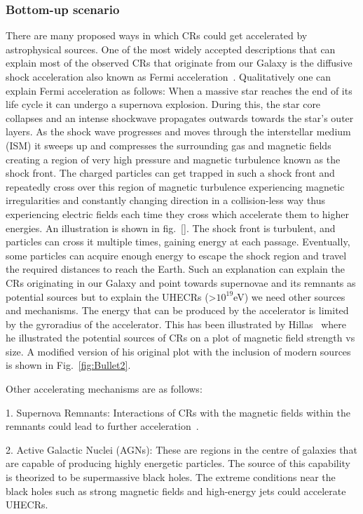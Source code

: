 \subsubsection{Bottom-up scenario}
\label{subsec:Bupsce}
There are many proposed ways in which CRs could get accelerated by astrophysical sources. One of the most widely accepted descriptions that can explain most of the observed CRs that originate from our Galaxy is the diffusive shock acceleration also known as Fermi acceleration~\cite{PhysRev.75.1169}. Qualitatively one can explain Fermi acceleration as follows: When a massive star reaches the end of its life cycle it can undergo a supernova explosion. During this, the star core collapses and an intense shockwave propagates outwards towards the star's outer layers. As the shock wave progresses and moves through the interstellar medium (ISM) it sweeps up and compresses the surrounding gas and magnetic fields creating a region of very high pressure and magnetic turbulence known as the shock front. The charged particles can get trapped in such a shock front and repeatedly cross over this region of magnetic turbulence experiencing magnetic irregularities and constantly changing direction in a collision-less way thus experiencing electric fields each time they cross which accelerate them to higher energies. An illustration is shown in fig.~\ref{}. The shock front is turbulent, and particles can cross it multiple times, gaining energy at each passage. Eventually, some particles can acquire enough energy to escape the shock region and travel the required distances to reach the Earth. Such an explanation can explain the CRs originating in our Galaxy and point towards supernovae and its remnants as potential sources but to explain the UHECRs (>$10^{19}$eV) we need other sources and mechanisms. The energy that can be produced by the accelerator is limited by the gyroradius of the accelerator. This has been illustrated by Hillas~\cite{1984ARA&A..22..425H} where he illustrated the potential sources of CRs on a plot of magnetic field strength vs size. A modified version of his original plot with the inclusion of modern sources is shown in Fig.~\ref{fig:Bullet2}.   

Other accelerating mechanisms are as follows:

1. Supernova Remnants:  Interactions of CRs with the magnetic fields within the remnants could lead to further acceleration~\cite{BLASI_2011}.

2. Active Galactic Nuclei (AGNs): These are regions in the centre of galaxies that are capable of producing highly energetic particles. The source of this capability is theorized to be supermassive black holes. The extreme conditions near the black holes such as strong magnetic fields and high-energy jets could accelerate UHECRs.~\cite{Rieger_2022}


